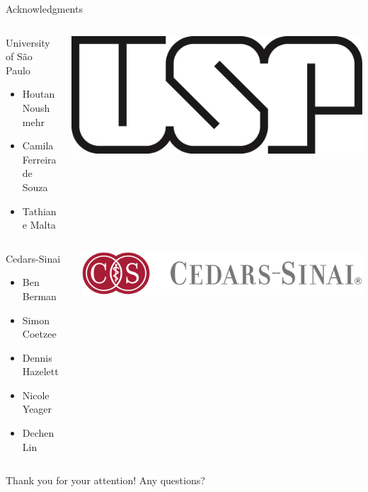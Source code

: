 \documentclass[slidestop,compress,11pt,xcolor=dvipsnames]{beamer}
\begin{document}
\begin{frame}{Acknowledgments}
 \begin{columns}[T]
  \begin{column}{0.5\textwidth}
   \begin{block}{University of São Paulo}
    \begin{itemize}
      \item  Houtan Noushmehr
      \item  Camila Ferreira de Souza
      \item  Tathiane Malta
    \end{itemize}
   \end{block}
  \end{column}
  \begin{column}{0.5\textwidth}
   \vspace{0.9cm}
   \includegraphics[width=0.4\linewidth]{logo/usp.png}
  \end{column}
 \end{columns}

 \vspace{0.2cm}
 \begin{columns}[T]
  \begin{column}{0.5\textwidth}
   \begin{block}{Cedars-Sinai}
    \begin{itemize}
     \item Ben Berman
     \item Simon Coetzee
     \item Dennis Hazelett
     \item Nicole Yeager
     \item Dechen Lin
    \end{itemize}
   \end{block}
  \end{column}
  \begin{column}{0.5\textwidth}
   \vspace{1.5cm}
   \includegraphics[width=1.0\linewidth]{cedars.png}
  \end{column}
 \end{columns}

\end{frame}



\begin{frame}{Thank you for your attention!}
 \vspace*{2.5cm}
 \centering
 \Huge{Any questions?}
\end{frame}


%
%
\end{document}
